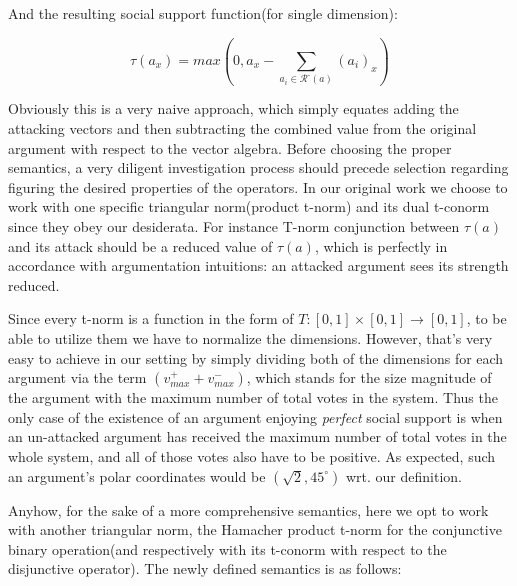 \documentclass{article}
\newcommand{\att}{\mathcal{R}}  %
\newcommand{\attackers}[1]{\att^\text{-}\left(#1\right)}
\newcommand{\SAFand}{\curlywedge}     %
\DeclareMathOperator*{\SAFOr}{\bigcurlyvee} %
\begin{document}
And the resulting social support function(for single dimension):

$$\displaystyle \tau(a_x) =   max (0, a_{x} - \sum_{a_i \in \attackers{a}}^{} (a_{i})_{x}   ) $$%


 Obviously this is a very naive approach, which simply equates adding the attacking vectors and then subtracting the combined value from the original argument with respect to the vector algebra. Before choosing the proper semantics, a very diligent investigation process should precede selection regarding figuring the desired properties of the operators. In our original work we choose to work with one specific triangular norm(product t-norm) and its dual t-conorm since they obey our desiderata. For instance T-norm conjunction between $\tau(a)$ and its attack should be a reduced value of $\tau(a)$, which is perfectly in accordance with argumentation intuitions: an attacked argument sees its strength reduced. 

Since every t-norm is a function in the form of $T: [0, 1] \times [0, 1] \rightarrow [0, 1] $, to be able to utilize them we have to normalize the dimensions. However, that's very easy to achieve in our setting by simply dividing both of the dimensions for each argument via the term $(v^{+}_{max} + v^{-}_{max})$, which stands for the size magnitude of the argument with the maximum number of total votes in the system. Thus the only case of the existence of an argument enjoying \textit{perfect} social support is when an un-attacked argument has received the maximum number of total votes in the whole system, and all of those votes also have to be positive. As expected, such an argument's polar coordinates would be $(\sqrt 2, 45^{\circ})$ wrt. our definition.

Anyhow, for the sake of a more comprehensive semantics, here we opt to work with another triangular norm, the Hamacher product t-norm for the conjunctive binary operation(and respectively with its t-conorm with respect to the disjunctive operator). The newly defined semantics is as follows:
\end{document}
